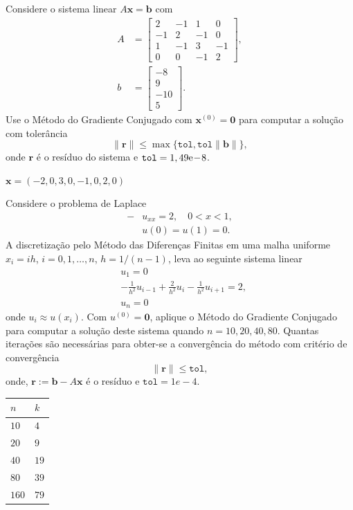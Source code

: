 \begin{exer}
  Considere o sistema linear $A\pmb{x} = \pmb{b}$ com
  \begin{align}
    A &=
    \begin{bmatrix}
      2 & -1 & 1 & 0\\
      -1 & 2 & -1 & 0\\
      1 & -1 & 3 & -1 \\
      0 & 0 & -1 & 2
    \end{bmatrix},\\
    b &=
    \begin{bmatrix}
      -8\\
      9\\
      -10\\
      5
    \end{bmatrix}.
  \end{align}
  Use o Método do Gradiente Conjugado com $\pmb{x}^{(0)} = \pmb{0}$ para computar a solução com tolerância
  \begin{equation}
    \|\pmb{r}\| \leq \max\{\texttt{tol}, \texttt{tol}\|\pmb{b}\|\},
  \end{equation}
  onde $\pmb{r}$ é o resíduo do sistema e $\texttt{tol} = 1,49\mathrm{e}\!-\!8$.
\end{exer}
\begin{resp}
  $\pmb{x} = \left(-2,0, 3,0, -1,0, 2,0\right)$
\end{resp}

\begin{exer}
  Considere o problema de Laplace
  \begin{align}
    -&u_{xx} = 2,\quad 0 < x < 1,\\
     &u(0) = u(1) = 0.
  \end{align}
  A discretização pelo Método das Diferenças Finitas em uma malha uniforme $x_i = ih$, $i=0,1,\dotsc,n$, $h=1/(n-1)$, leva ao seguinte sistema linear
  \begin{align}
    &u_1 = 0\\
    &-\frac{1}{h^2}u_{i-1} + \frac{2}{h^2}u_{i} - \frac{1}{h^2}u_{i+1} = 2,\\
    &u_n = 0
  \end{align}
  onde $u_i \approx u(x_i)$. Com $u^{(0)} = \pmb{0}$, aplique o Método do Gradiente Conjugado para computar a solução deste sistema quando $n=10, 20, 40, 80$. Quantas iterações são necessárias para obter-se a convergência do método com critério de convergência
  \begin{equation}
    \|\pmb{r}\| \leq \texttt{tol},
  \end{equation}
  onde, $\pmb{r} := \pmb{b} - A\pmb{x}$ é o resíduo e $\texttt{tol} = 1e-4$.
\end{exer}
\begin{resp}
  \begin{tabular}{ll}
    $n$ & $k$\\\hline
    $10$ & $4$\\
    $20$ & $9$\\
    $40$ & $19$\\
    $80$ & $39$\\
    $160$ & $79$
  \end{tabular}
\end{resp}


